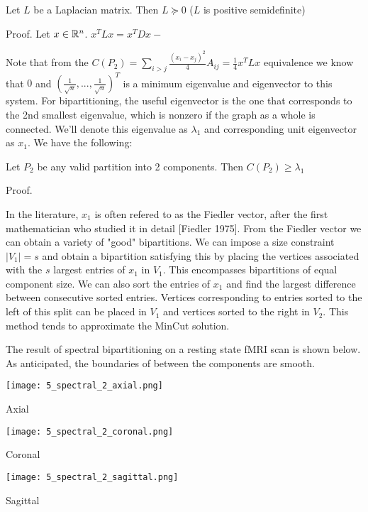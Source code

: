\begin{theorem} \label{Laplacian_psd}
Let $L$ be a Laplacian matrix. Then $L \succeq 0$
($L$ is positive semidefinite)

Proof. Let $x \in \mathbb{R}^n$. $x^T L x = x^T D x - $
\end{theorem}

Note that from the
$C(P_2) = \sum_{i > j} \frac{(x_i - x_j)^2}{4} A_{ij}
        = \frac{1}{4} x^T L x$ equivalence we know that
$0$ and $(\frac{1}{\sqrt{n}}, ..., \frac{1}{\sqrt{n}})^T$ is a minimum
eigenvalue and eigenvector to this system. For bipartitioning, the
useful eigenvector is the one that corresponds to the 2nd smallest
eigenvalue, which is nonzero if the graph as a whole is connected.
We'll denote this eigenvalue as $\lambda_1$ and corresponding unit
eigenvector as $x_1$. We have the following:

\begin{theorem}
Let $P_2$ be any valid partition into 2 components. Then
$C(P_2) \geq \lambda_1$

Proof.
\end{theorem}

In the literature, $x_1$ is often refered to as the Fiedler vector,
after the first mathematician who studied it in detail [Fiedler 1975].
From the Fiedler vector we can obtain a variety of "good" bipartitions.
We can impose a size constraint $|V_1| = s$ and obtain a bipartition
satisfying this by placing the vertices associated with the $s$ largest
entries of $x_1$ in $V_1$. This encompasses bipartitions of equal
component size. We can also sort the entries of $x_1$ and find the
largest difference between consecutive sorted entries. Vertices
corresponding to entries sorted to the left of this split can be placed
in $V_1$ and vertices sorted to the right in $V_2$. This method tends to
approximate the MinCut solution.

The result of spectral bipartitioning on a resting state fMRI scan
is shown below. As anticipated, the boundaries of between the
components are smooth.

\begin{center}
\texttt{[image: 5\_spectral\_2\_axial.png]}

Axial

\texttt{[image: 5\_spectral\_2\_coronal.png]}

Coronal

\texttt{[image: 5\_spectral\_2\_sagittal.png]}

Sagittal
\end{center}

